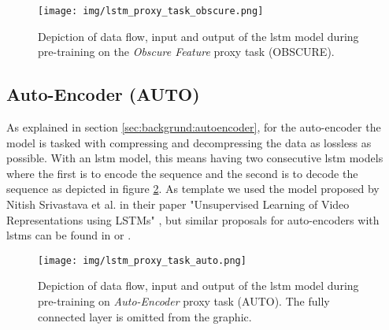 \begin{figure}[h]
	\centering
	\texttt{[image: img/lstm\_proxy\_task\_obscure.png]}
	\caption{Depiction of data flow, input and output of the \gls{lstm} model during pre-training on the \textit{Obscure Feature} proxy task (OBSCURE). }
	\label{fig:experiments:lstm_proxy_task_obscure}
\end{figure}

\subsection{Auto-Encoder (AUTO)} \label{sec:experiments:lstm:auto_encoder}

As explained in section \ref{sec:backgrund:autoencoder}, for the auto-encoder the model is tasked with compressing and decompressing the data as lossless as possible. With an \gls{lstm} model, this means having two consecutive \gls{lstm} models where the first is to encode the sequence and the second is to decode the sequence as depicted in figure \ref{fig:experiments:lstm_proxy_task_auto}. As template we used the model proposed by Nitish Srivastava et al. in their paper "Unsupervised Learning of Video Representations using LSTMs" \cite{unsupervised_learning_lstms}, but similar proposals for auto-encoders with \glspl{lstm} can be found in \cite{unsupervised_learning_lstms_timeseries} or \cite{lstm_anomaly_detection}. \par

\begin{figure}[h]
	\centering
	\texttt{[image: img/lstm\_proxy\_task\_auto.png]}
	\caption{Depiction of data flow, input and output of the \gls{lstm} model during pre-training on \textit{Auto-Encoder} proxy task (AUTO). The fully connected layer is omitted from the graphic. }
	\label{fig:experiments:lstm_proxy_task_auto}
\end{figure}


